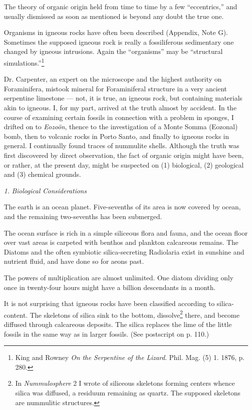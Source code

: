 \documentclass[a4paper, 12pt, oneside]{article}
\begin{document}
The theory of organic origin held from time to time by a few ``eccentrics,'' and usually dismissed as soon as mentioned is beyond any doubt the true one.

Organisms in igneous rocks have often been described (Appendix, Note G). Sometimes the supposed igneous rock is really a fossiliferous sedimentary one changed by igneous intrusions. Again the ``organisms'' may be ``structural simulations.''\footnote{King and Rowney \emph{On the Serpentine of the Lizard}. Phil. Mag. (5) 1. 1876, p. 280.}

Dr. Carpenter, an expert on the microscope and the highest authority on Foraminifera, mistook mineral for Foraminiferal structure in a very ancient serpentine limestone --- not, it is true, an igneous rock, but containing materials akin to igneous. I, for my part, arrived at the truth almost by accident. In the course of examining certain fossils in connection with a problem in sponges, I drifted on to \emph{Eozoön}, thence to the investigation of a Monte Somma (Eozonal) bomb, then to volcanic rocks in Porto Santo, and finally to igneous rocks in general. I continually found traces of nummulite shells. Although the truth was first discovered by direct observation, the fact of organic origin might have been, or rather, at the present day, might be suspected on (1) biological, (2) geological and (3) chemical grounds.

\bigskip
\centerline{\emph{1. Biological Considerations}}

The earth is an ocean planet. Five-sevenths of its area is now covered by ocean, and the remaining two-sevenths has been submerged.

The ocean surface is rich in a simple siliceous flora and fauna, and the ocean floor over vast areas is carpeted with benthos and plankton calcareous remains. The Diatoms and the often symbiotic silica-secreting Radiolaria exist in sunshine and nutrient fluid, and have done so for aeons past.

The powers of multiplication are almost unlimited. One diatom dividing only once in twenty-four hours might have a billion descendants in a month.

It is not surprising that igneous rocks have been classified according to silica-content. The skeletons of silica sink to the bottom, dissolve\footnote{In \emph{Nummulosphere} 2 I wrote of siliceous skeletons forming centers whence silica was diffused, a residuum remaining as quartz. The supposed skeletons are nummulitic structures.} there, and become diffused through calcareous deposits. The silica replaces the lime of the little fossils in the same way as in larger fossils. (See postscript on p. 110.)
\end{document}
